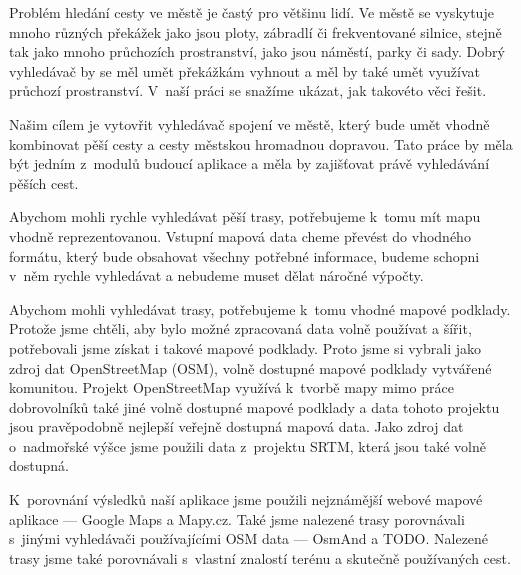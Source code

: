 
Problém hledání cesty ve městě je častý pro většinu lidí. Ve městě se vyskytuje
mnoho různých překážek jako jsou ploty, zábradlí či frekventované silnice,
stejně tak jako mnoho průchozích prostranství, jako jsou náměstí, parky či sady.
Dobrý vyhledávač by se měl umět překážkám vyhnout a měl by také umět využívat
průchozí prostranství. V~naší práci se snažíme ukázat, jak takovéto věci řešit.

Našim cílem je vytovřit vyhledávač spojení ve městě, který bude umět vhodně
kombinovat pěší cesty a cesty městskou hromadnou dopravou. Tato práce by měla
být jedním z~modulů budoucí aplikace a měla by zajišťovat právě vyhledávání
pěších cest.

Abychom mohli rychle vyhledávat pěší trasy, potřebujeme k~tomu mít mapu vhodně
reprezentovanou. Vstupní mapová data cheme převést do vhodného formátu, který
bude obsahovat všechny potřebné informace, budeme schopni v~něm rychle
vyhledávat a nebudeme muset dělat náročné výpočty. 

Abychom mohli vyhledávat trasy, potřebujeme k~tomu vhodné mapové podklady.
Protože jsme chtěli, aby bylo možné zpracovaná data volně používat a šířit, 
potřebovali jsme získat i takové mapové podklady. Proto jsme si vybrali jako
zdroj dat OpenStreetMap (OSM), volně dostupné mapové podklady vytvářené komunitou. 
Projekt OpenStreetMap využívá k~tvorbě mapy mimo práce dobrovolníků také jiné
volně dostupné mapové podklady a data tohoto projektu jsou pravěpodobně nejlepší
veřejně dostupná mapová data. Jako zdroj dat o~nadmořské výšce jsme použili data
z~projektu SRTM, která jsou také volně dostupná.

K~porovnání výsledků naší aplikace jsme použili nejznámější webové mapové
aplikace --- Google Maps a Mapy.cz. Také jsme nalezené trasy porovnávali s~jinými
vyhledávači používajícími OSM data --- OsmAnd a TODO. Nalezené trasy jsme také
porovnávali s~vlastní znalostí terénu a skutečně používaných cest.

